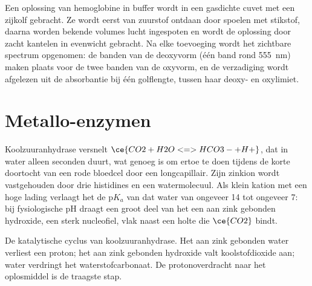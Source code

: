 \begin{inthelab}
Een oplossing van hemoglobine in buffer wordt in een gasdichte cuvet met
een zijkolf gebracht. Ze wordt eerst van zuurstof ontdaan door spoelen
met stikstof, daarna worden bekende volumes lucht ingespoten en wordt de
oplossing door zacht kantelen in evenwicht gebracht. Na elke toevoeging
wordt het zichtbare spectrum opgenomen: de banden van de deoxyvorm (één
band rond \qty{555}{nm}) maken plaats voor de twee banden van de oxyvorm,
en de verzadiging wordt afgelezen uit de absorbantie bij één golflengte,
tussen haar deoxy- en oxylimiet.
\end{inthelab}

\section{Metallo-enzymen}

Koolzuuranhydrase versnelt $\ce{CO2 + H2O <=> HCO3- + H+}$, dat in water alleen seconden
duurt, wat genoeg is om ertoe te doen tijdens de korte doortocht van een
rode bloedcel door een longcapillair. Zijn zinkion wordt vastgehouden
door drie histidines en een watermolecuul. Als klein kation met een hoge
lading verlaagt het de $\mathrm pK_a$ van dat water van ongeveer 14 tot
ongeveer 7: bij fysiologische pH draagt een groot deel van het  een
aan zink gebonden hydroxide, een sterk nucleofiel, vlak naast een holte
die $\ce{CO2}$ bindt.

\begin{omfigure}

{\small De katalytische cyclus van koolzuuranhydrase. Het aan zink
gebonden water verliest een proton; het aan zink gebonden hydroxide valt
koolstofdioxide aan; water verdringt het waterstofcarbonaat. De
protonoverdracht naar het oplosmiddel is de traagste stap.}
\end{omfigure}

